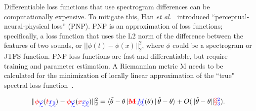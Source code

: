 \documentclass[lettersize,journal]{IEEEtran}
\makeatletter
\newcommand{\xtheta}{x_{\theta}} %
\newcommand{\xzero}{x_{0}}       %
\providecommand{\DIFadd}[1]{{\protect\color{blue}\uwave{#1}}} %
\providecommand{\DIFdel}[1]{{\protect\color{red}\sout{#1}}} %
\providecommand{\DIFaddbegin}{} %
\providecommand{\DIFaddend}{} %
\providecommand{\DIFdelbegin}{} %
\providecommand{\DIFdelend}{} %
\providecommand{\DIFscaledelfig}{0.5}
\newlength{\DIFdelgraphicswidth} %
\newlength{\DIFdelgraphicsheight} %
\providecommand{\DIFaddincludegraphics}[2][]{{\color{blue}\fbox{\DIFOincludegraphics[#1]{#2}}}} %
\providecommand{\DIFdelincludegraphics}[2][]{%
\sbox{\DIFdelgraphicsbox}{\DIFOincludegraphics[#1]{#2}}%
\settoboxwidth{\DIFdelgraphicswidth}{\DIFdelgraphicsbox} %
\settoboxtotalheight{\DIFdelgraphicsheight}{\DIFdelgraphicsbox} %
\scalebox{\DIFscaledelfig}{%
\parbox[b]{\DIFdelgraphicswidth}{\usebox{\DIFdelgraphicsbox}\\[-\baselineskip] \rule{\DIFdelgraphicswidth}{0em}}\llap{\resizebox{\DIFdelgraphicswidth}{\DIFdelgraphicsheight}{%
\setlength{\unitlength}{\DIFdelgraphicswidth}%
\begin{picture}(1,1)%
\thicklines\linethickness{2pt} %
{\color[rgb]{1,0,0}\put(0,0){\framebox(1,1){}}}%
{\color[rgb]{1,0,0}\put(0,0){\line( 1,1){1}}}%
{\color[rgb]{1,0,0}\put(0,1){\line(1,-1){1}}}%
\end{picture}%
}\hspace*{3pt}}} %
} %
\DeclareRobustCommand{\DIFaddbegin}{\DIFOaddbegin \let\includegraphics\DIFaddincludegraphics} %
\DeclareRobustCommand{\DIFaddend}{\DIFOaddend \let\includegraphics\DIFOincludegraphics} %
\DeclareRobustCommand{\DIFdelbegin}{\DIFOdelbegin \let\includegraphics\DIFdelincludegraphics} %
\DeclareRobustCommand{\DIFdelend}{\DIFOaddend \let\includegraphics\DIFOincludegraphics} %
\let\sout@orig\sout %
\renewcommand{\sout}[1]{\ifmmode\text{\sout@orig{\ensuremath{#1}}}\else\sout@orig{#1}\fi} %
\makeatother
\begin{document}
\DIFdelbegin %

\DIFdelend Differentiable loss functions that use spectrogram differences can be computationally expensive. To mitigate this, Han \textit{et al.}~\cite{han2023perceptual} introduced ``perceptual-neural-physical loss'' (PNP). PNP is an approximation of loss functions; specifically, a loss function that uses the L2 norm of the difference between the features of two sounds, or $||\phi(t) - \phi(x)||^2_2$, where $\phi$ could be a spectrogram or JTFS function. PNP loss functions are fast and differentiable, but require training and parameter estimation. A Riemannian metric M needs to be calculated for the minimization of locally linear approximation of the ``true" spectral loss function~\cite{han2023perceptual}. 
\DIFaddbegin 

\DIFaddend \[
\| \DIFdelbegin \DIFdel{\phi}\DIFdelend \DIFaddbegin \DIFadd{\varphi}\DIFaddend (\DIFdelbegin \DIFdel{t}\DIFdelend \DIFaddbegin \DIFadd{\xzero}\DIFaddend ) - \DIFdelbegin \DIFdel{\phi}\DIFdelend \DIFaddbegin \DIFadd{\varphi}\DIFaddend (\DIFdelbegin \DIFdel{x}\DIFdelend \DIFaddbegin \DIFadd{\xtheta}\DIFaddend ) \|_2^2
= \langle \tilde{\theta} - \theta \DIFaddbegin \DIFadd{\,}\DIFaddend |\DIFdelbegin \DIFdel{\mathbf{M}}\DIFdelend \DIFaddbegin \DIFadd{\, M}\DIFaddend (\theta) \DIFaddbegin \DIFadd{\,}\DIFaddend |\DIFaddbegin \DIFadd{\, }\DIFaddend \tilde{\theta} - \theta \rangle
+ O(\|\tilde{\theta} - \theta\|\DIFdelbegin \DIFdel{_2^3}\DIFdelend \DIFaddbegin \DIFadd{_3^2}\DIFaddend ).
\DIFdelbegin %
\DIFdelend \]
\end{document}
